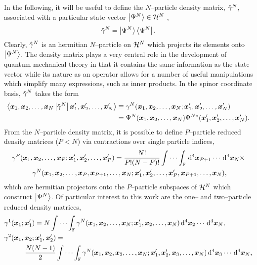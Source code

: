 In the following, it will be useful to define the $N$--particle density matrix, $\hat{\gamma}^N$,
associated with a particular state vector $\left\vert \Psi^N \right\rangle \in \mathcal{H}^N$ \cite{Yang89_book},
\begin{equation}
\hat{\gamma}^N = \left\vert \Psi^N \right\rangle\left\langle \Psi^N \right\vert.
\end{equation}
Clearly, $\hat{\gamma}^N$ is an hermitian $N$--particle on $\mathcal{H}^N$ which projects its elements onto $\left\vert \Psi^N \right\rangle$.
The density matrix plays a very central role in the development of quantum mechanical theory in that
it contains the same information as the state vector while its nature as an operator allows for a number
of useful manipulations which simplify many expressions, such as inner products. 
In the spinor coordinate basis, $\hat{\gamma}^N$ takes the form
\begin{align}
\label{eq:DenMatSpace}
\left\langle \boldsymbol{x}_1,\boldsymbol{x}_2,\ldots,\boldsymbol{x}_N \left\vert \hat{\gamma}^N \right\vert \boldsymbol{x}'_1,\boldsymbol{x}'_2,\ldots,\boldsymbol{x}'_N \right\rangle
  &\equiv \gamma^N(\boldsymbol{x}_1,\boldsymbol{x}_2,\ldots,\boldsymbol{x}_N; \boldsymbol{x}'_1,\boldsymbol{x}'_2,\ldots,\boldsymbol{x}'_N) \\
  &= \Psi^N(\boldsymbol{x}_1,\boldsymbol{x}_2,\ldots,\boldsymbol{x}_N)\Psi^{N*}(\boldsymbol{x}'_1,\boldsymbol{x}'_2,\ldots,\boldsymbol{x}'_N). \nonumber
\end{align}
From the $N$--particle density matrix, it is possible to define $P$--particle reduced density matrices ($P < N$)
via contractions over single particle indices,
\begin{align}
  &\gamma^P(\boldsymbol{x}_1,\boldsymbol{x}_2,\ldots,\boldsymbol{x}_P;\boldsymbol{x}'_1,\boldsymbol{x}'_2,\ldots,\boldsymbol{x}'_P) = \frac{N!}{P!(N-P)!}
    \idotsint_\mathbb{F} \,\mathrm{d}^4\boldsymbol{x}_{P+1}\cdots\,\mathrm{d}^4\boldsymbol{x}_N \times \nonumber \\
  &\qquad \quad \gamma^N(\boldsymbol{x}_1,\boldsymbol{x}_2,\ldots,\boldsymbol{x}_P,\boldsymbol{x}_{P+1},\ldots,\boldsymbol{x}_N;\boldsymbol{x}'_1,\boldsymbol{x}'_2,\ldots,\boldsymbol{x}'_P,\boldsymbol{x}_{P+1},\ldots,\boldsymbol{x}_N),
\end{align}
which are hermitian projectors onto the $P$--particle subspaces of $\mathcal{H}^N$ which construct $\left\vert \Psi^N \right\rangle$. 
Of particular interest to this work are the one-- and two--particle reduced density matrices,
\begin{align}
&\gamma^1(\boldsymbol{x}_1;\boldsymbol{x}'_1) = N \idotsint_\mathbb{F}
  \gamma^N(\boldsymbol{x}_1,\boldsymbol{x}_2,\ldots,\boldsymbol{x}_N;\boldsymbol{x}'_1,\boldsymbol{x}_2,\ldots,\boldsymbol{x}_N) \,\mathrm{d}^4\boldsymbol{x}_{2}\cdots\,\mathrm{d}^4\boldsymbol{x}_N, \\
&\gamma^2(\boldsymbol{x}_1,\boldsymbol{x}_2;\boldsymbol{x}'_1,\boldsymbol{x}'_2) =  \nonumber \\ &\qquad \quad \frac{N(N-1)}{2} \idotsint_\mathbb{F}
  \gamma^N(\boldsymbol{x}_1,\boldsymbol{x}_2,\boldsymbol{x}_3,\ldots,\boldsymbol{x}_N;\boldsymbol{x}'_1,\boldsymbol{x}'_2,\boldsymbol{x}_3,\ldots,\boldsymbol{x}_N) \,\mathrm{d}^4\boldsymbol{x}_{3}\cdots\,\mathrm{d}^4\boldsymbol{x}_N,
\end{align}
